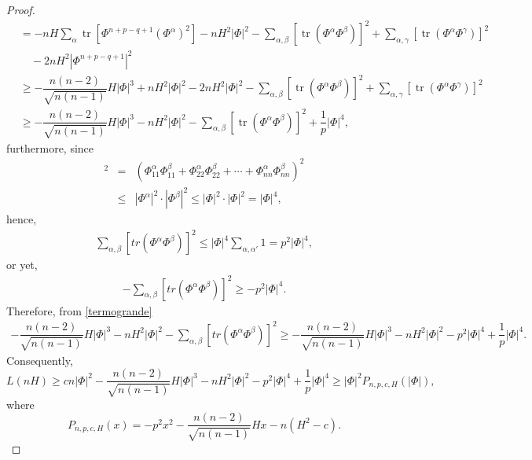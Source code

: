 \documentclass[leqno,11pt]{amsart}
\theoremstyle{plain}
\theoremstyle{definition}
\numberwithin{equation}{section}
\begin{document}
\begin{proof}
\begin{align}
&= -nH\sum_{\alpha}\operatorname{tr}[\Phi^{n+p-q+1}(\Phi^{\alpha})^2]
     -nH^2|\Phi|^2
     -\sum_{\alpha,\beta}[\operatorname{tr}(\Phi^{\alpha}\Phi^{\beta})]^2
     +\sum_{\alpha,\gamma}[\operatorname{tr}(\Phi^{\alpha}\Phi^{\gamma})]^2 \nonumber \\
&\quad -2nH^2|\Phi^{n+p-q+1}|^2 \nonumber \\[4pt]
&\geq -\dfrac{n(n-2)}{\sqrt{n(n-1)}}H|\Phi|^3
      +nH^2|\Phi|^2
      -2nH^2|\Phi|^2
      -\sum_{\alpha,\beta}[\operatorname{tr}(\Phi^{\alpha}\Phi^{\beta})]^2
      +\sum_{\alpha,\gamma}[\operatorname{tr}(\Phi^{\alpha}\Phi^{\gamma})]^2 \\[4pt]
&\geq -\dfrac{n(n-2)}{\sqrt{n(n-1)}}H|\Phi|^3
      -nH^2|\Phi|^2
      -\sum_{\alpha,\beta}[\operatorname{tr}(\Phi^{\alpha}\Phi^{\beta})]^2
      +\dfrac{1}{p}|\Phi|^4, \nonumber
\end{align}
furthermore, since
\begin{eqnarray*}
[tr(\Phi^{\alpha}\Phi^{\beta})]^2&=&(\Phi_{11}^{\alpha}\Phi_{11}^{\beta}+\Phi_{22}^{\alpha}\Phi_{22}^{\beta}+\cdots+\Phi_{nn}^{\alpha}\Phi_{nn}^{\beta})^2\\
&\leq&|\Phi^{\alpha}|^2\cdot |\Phi^{\beta}|^2\leq |\Phi|^2\cdot |\Phi|^2=|\Phi|^4,
\end{eqnarray*}
hence,
\begin{eqnarray*}
\sum_{\alpha,\beta}[tr(\Phi^{\alpha}\Phi^{\beta})]^2\leq |\Phi|^4\sum_{\alpha,\alpha'}1=p^2|\Phi|^4,
\end{eqnarray*}
or yet, 
\begin{eqnarray*}
-\sum_{\alpha,\beta}[tr(\Phi^{\alpha}\Phi^{\beta})]^2\geq -p^2|\Phi|^4.
\end{eqnarray*}
Therefore, from \eqref{termogrande}
\begin{eqnarray*}
-\dfrac{n(n-2)}{\sqrt{n(n-1)}}H|\Phi|^3-nH^2|\Phi|^2-\sum_{\alpha,\beta}[tr(\Phi^{\alpha}\Phi^{\beta})]^2\geq -\dfrac{n(n-2)}{\sqrt{n(n-1)}}H|\Phi|^3-nH^2|\Phi|^2-p^2|\Phi|^4+\dfrac{1}{p}|\Phi|^4.
\end{eqnarray*}
Consequently,
\begin{equation}\label{4.7}
L(nH)\geq cn|\Phi|^2-\dfrac{n(n-2)}{\sqrt{n(n-1)}}H|\Phi|^3-nH^2|\Phi|^2-p^2|\Phi|^4+\dfrac{1}{p}|\Phi|^4
\geq |\Phi|^2P_{n,p,c,H}(|\Phi|),
\end{equation}
where
\begin{equation}
P_{n,p,c,H}(x)=-p^2x^2-\dfrac{n(n-2)}{\sqrt{n(n-1)}}Hx-n(H^2-c).
\end{equation}

\end{proof}
\end{document}
